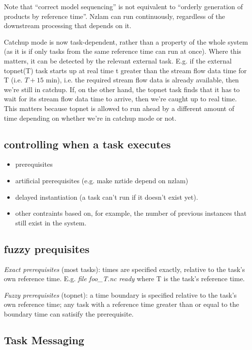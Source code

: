 \documentclass[11pt,a4paper]{article}
\begin{document}
Note that ``correct model sequencing'' is not equivalent to ``orderly
generation of products by reference time''.  Nzlam can run continuously,
regardless of the downstream processing that depends on it.

Catchup mode is now task-dependent, rather than a property of the whole
system (as it is if only tasks from the same reference time can run at
once).  Where this matters, it can be detected by the relevant external
task. E.g. if the external topnet(T) task starts up at real time t
greater than the stream flow data time for T (i.e. $T+15$ min), i.e. the
required stream flow data is already available, then we're still in
catchup. If, on the other hand, the topnet task finds that it has to
wait for its stream flow data time to arrive, then we're caught up to
real time.  This matters because topnet is allowed to run ahead by a
different amount of time depending on whether we're in catchup mode or
not.


\subsection{controlling when a task executes}

\begin{itemize}
 \item  prerequisites
 \item artificial prerequisites (e.g. make nztide depend on nzlam)
 \item delayed instantiation (a task can't run if it doesn't exist yet).
 \item other contraints based on, for example, the number of previous
 instances that still exist in the system.
\end{itemize}


\subsection{fuzzy prequisites}

{\em Exact prerequisites} (most tasks): times are specified exactly,
relative to the task's own reference time.  E.g. {\em file foo\_{T}.nc
ready} where T is the task's reference time.

{\em Fuzzy prerequisites} (topnet): a time boundary is specified
relative to the task's own reference time; any task with a reference
time greater than or equal to the boundary time can satisify the
prerequisite.

\subsection{Task Messaging}
\end{document}
